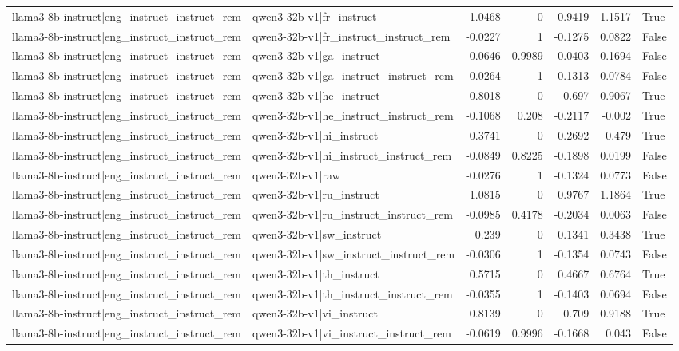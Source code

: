 \begin{table}
\begin{tabular}{l l r r r r l}
llama3-8b-instruct|eng_instruct_instruct_rem & qwen3-32b-v1|fr_instruct & 1.0468 & 0 & 0.9419 & 1.1517 & True \\
llama3-8b-instruct|eng_instruct_instruct_rem & qwen3-32b-v1|fr_instruct_instruct_rem & -0.0227 & 1 & -0.1275 & 0.0822 & False \\
llama3-8b-instruct|eng_instruct_instruct_rem & qwen3-32b-v1|ga_instruct & 0.0646 & 0.9989 & -0.0403 & 0.1694 & False \\
llama3-8b-instruct|eng_instruct_instruct_rem & qwen3-32b-v1|ga_instruct_instruct_rem & -0.0264 & 1 & -0.1313 & 0.0784 & False \\
llama3-8b-instruct|eng_instruct_instruct_rem & qwen3-32b-v1|he_instruct & 0.8018 & 0 & 0.697 & 0.9067 & True \\
llama3-8b-instruct|eng_instruct_instruct_rem & qwen3-32b-v1|he_instruct_instruct_rem & -0.1068 & 0.208 & -0.2117 & -0.002 & True \\
llama3-8b-instruct|eng_instruct_instruct_rem & qwen3-32b-v1|hi_instruct & 0.3741 & 0 & 0.2692 & 0.479 & True \\
llama3-8b-instruct|eng_instruct_instruct_rem & qwen3-32b-v1|hi_instruct_instruct_rem & -0.0849 & 0.8225 & -0.1898 & 0.0199 & False \\
llama3-8b-instruct|eng_instruct_instruct_rem & qwen3-32b-v1|raw & -0.0276 & 1 & -0.1324 & 0.0773 & False \\
llama3-8b-instruct|eng_instruct_instruct_rem & qwen3-32b-v1|ru_instruct & 1.0815 & 0 & 0.9767 & 1.1864 & True \\
llama3-8b-instruct|eng_instruct_instruct_rem & qwen3-32b-v1|ru_instruct_instruct_rem & -0.0985 & 0.4178 & -0.2034 & 0.0063 & False \\
llama3-8b-instruct|eng_instruct_instruct_rem & qwen3-32b-v1|sw_instruct & 0.239 & 0 & 0.1341 & 0.3438 & True \\
llama3-8b-instruct|eng_instruct_instruct_rem & qwen3-32b-v1|sw_instruct_instruct_rem & -0.0306 & 1 & -0.1354 & 0.0743 & False \\
llama3-8b-instruct|eng_instruct_instruct_rem & qwen3-32b-v1|th_instruct & 0.5715 & 0 & 0.4667 & 0.6764 & True \\
llama3-8b-instruct|eng_instruct_instruct_rem & qwen3-32b-v1|th_instruct_instruct_rem & -0.0355 & 1 & -0.1403 & 0.0694 & False \\
llama3-8b-instruct|eng_instruct_instruct_rem & qwen3-32b-v1|vi_instruct & 0.8139 & 0 & 0.709 & 0.9188 & True \\
llama3-8b-instruct|eng_instruct_instruct_rem & qwen3-32b-v1|vi_instruct_instruct_rem & -0.0619 & 0.9996 & -0.1668 & 0.043 & False \\

\end{tabular}
\end{table}
